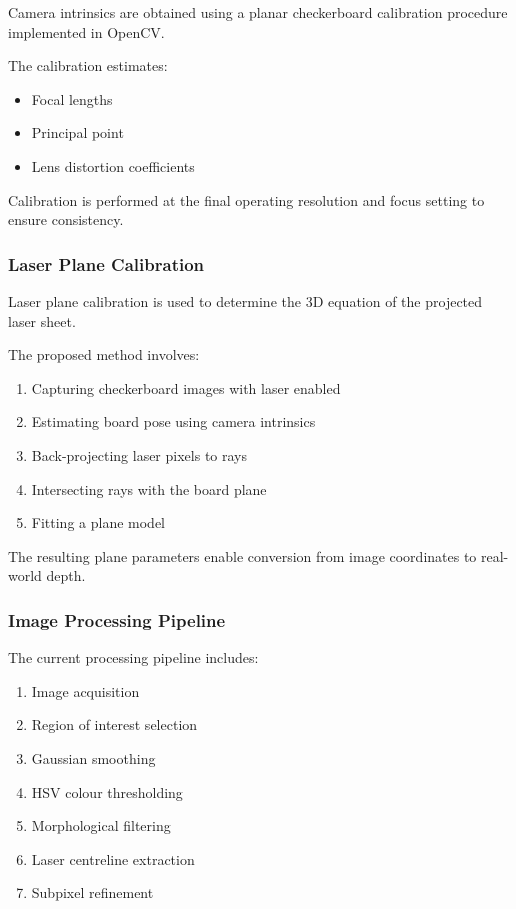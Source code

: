 \documentclass[11pt,a4paper]{article}
\begin{document}
Camera intrinsics are obtained using a planar checkerboard calibration procedure implemented in OpenCV.

The calibration estimates:

\begin{itemize}
  \item Focal lengths
  \item Principal point
  \item Lens distortion coefficients
\end{itemize}

Calibration is performed at the final operating resolution and focus setting to ensure consistency.

\subsubsection{Laser Plane Calibration}

Laser plane calibration is used to determine the 3D equation of the projected laser sheet.

The proposed method involves:

\begin{enumerate}
  \item Capturing checkerboard images with laser enabled
  \item Estimating board pose using camera intrinsics
  \item Back-projecting laser pixels to rays
  \item Intersecting rays with the board plane
  \item Fitting a plane model
\end{enumerate}

The resulting plane parameters enable conversion from image coordinates to real-world depth.

\subsubsection{Image Processing Pipeline}

The current processing pipeline includes:

\begin{enumerate}
  \item Image acquisition
  \item Region of interest selection
  \item Gaussian smoothing
  \item HSV colour thresholding
  \item Morphological filtering
  \item Laser centreline extraction
  \item Subpixel refinement
\end{enumerate}
\end{document}
